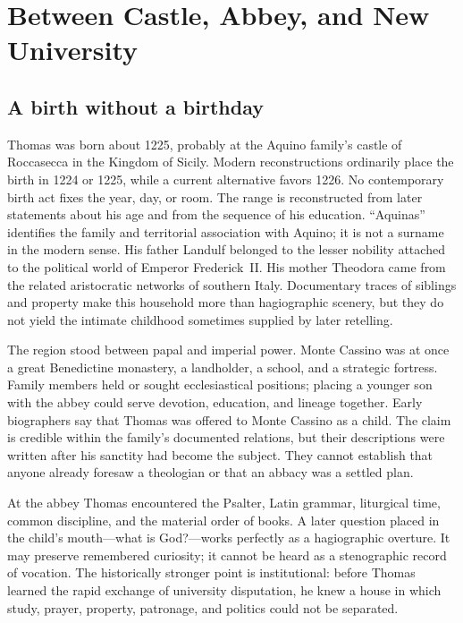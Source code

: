 \section{Between Castle, Abbey, and New University}

\subsection{A birth without a birthday}

Thomas was born about 1225, probably at the Aquino family's castle of Roccasecca
in the Kingdom of Sicily.  Modern reconstructions ordinarily place the birth in
1224 or 1225, while a current alternative favors 1226.  No contemporary birth
act fixes the year, day, or room.  The range is reconstructed from later
statements about his age and from the sequence of his education.  ``Aquinas''
identifies the family and territorial association with Aquino; it is not a
surname in the modern sense.
His father Landulf belonged to the lesser nobility attached to the political
world of Emperor Frederick~II.  His mother Theodora came from the related
aristocratic networks of southern Italy.  Documentary traces of siblings and
property make this household more than hagiographic scenery, but they do not
yield the intimate childhood sometimes supplied by later retelling.

The region stood between papal and imperial power.  Monte Cassino was at once a
great Benedictine monastery, a landholder, a school, and a strategic fortress.
Family members held or sought ecclesiastical positions; placing a younger son
with the abbey could serve devotion, education, and lineage together.  Early
biographers say that Thomas was offered to Monte Cassino as a child.  The claim
is credible within the family's documented relations, but their descriptions
were written after his sanctity had become the subject.  They cannot establish
that anyone already foresaw a theologian or that an abbacy was a settled plan.

At the abbey Thomas encountered the Psalter, Latin grammar, liturgical time,
common discipline, and the material order of books.  A later question placed in
the child's mouth---what is God?---works perfectly as a hagiographic overture.
It may preserve remembered curiosity; it cannot be heard as a stenographic
record of vocation.  The historically stronger point is institutional: before
Thomas learned the rapid exchange of university disputation, he knew a house in
which study, prayer, property, patronage, and politics could not be separated.

